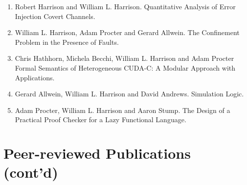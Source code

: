 \documentclass[11pt]{article}
\begin{document}
\begin{enumerate}[leftmargin=0.0mm,resume]
\item
Robert Harrison and William L. Harrison.
\newblock Quantitative Analysis of Error Injection Covert Channels.

\item
   William L. Harrison, Adam Procter and Gerard Allwein.
\newblock The Confinement Problem in the Presence of Faults.
                  
\item
Chris Hathhorn, Michela Becchi, William L. Harrison and Adam Procter
\newblock Formal Semantics of Heterogeneous CUDA-C: A Modular Approach with Applications.

\item
Gerard Allwein, William L. Harrison and David Andrews.
\newblock Simulation Logic.

\item
 Adam Procter, William L. Harrison and Aaron Stump.
 \newblock The Design of a Practical Proof Checker for a Lazy Functional Language.

\end{enumerate}

\section{Peer-reviewed Publications (cont'd)}
\end{document}
